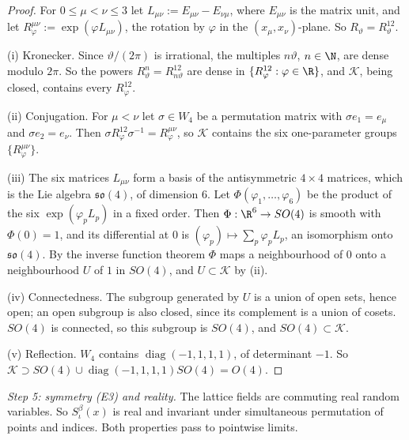 \begin{proof}
For $0\le\mu<\nu\le3$ let $L_{\mu\nu}:=E_{\mu\nu}-E_{\nu\mu}$, where $E_{\mu\nu}$ is the matrix unit, and let $R^{\mu\nu}_\varphi:=\exp(\varphi L_{\mu\nu})$, the rotation by $\varphi$ in the $(x_\mu,x_\nu)$-plane. So $R_\vartheta=R^{12}_\vartheta$.

(i) Kronecker. Since $\vartheta/(2\pi)$ is irrational, the multiples $n\vartheta$, $n\in\N$, are dense modulo $2\pi$. So the powers $R_\vartheta^n=R^{12}_{n\vartheta}$ are dense in $\{R^{12}_\varphi:\varphi\in\R\}$, and $\mathcal K$, being closed, contains every $R^{12}_\varphi$.

(ii) Conjugation. For $\mu<\nu$ let $\sigma\in W_4$ be a permutation matrix with $\sigma e_1=e_\mu$ and $\sigma e_2=e_\nu$. Then $\sigma R^{12}_\varphi\sigma^{-1}=R^{\mu\nu}_\varphi$, so $\mathcal K$ contains the six one-parameter groups $\{R^{\mu\nu}_\varphi\}$.

(iii) The six matrices $L_{\mu\nu}$ form a basis of the antisymmetric $4\times4$ matrices, which is the Lie algebra $\mathfrak{so}(4)$, of dimension $6$. Let $\Phi(\varphi_1,\dots,\varphi_6)$ be the product of the six $\exp(\varphi_pL_p)$ in a fixed order. Then $\Phi:\R^6\to SO(4)$ is smooth with $\Phi(0)=1$, and its differential at $0$ is $(\varphi_p)\mapsto\sum_p\varphi_pL_p$, an isomorphism onto $\mathfrak{so}(4)$. By the inverse function theorem $\Phi$ maps a neighbourhood of $0$ onto a neighbourhood $U$ of $1$ in $SO(4)$, and $U\subset\mathcal K$ by (ii).

(iv) Connectedness. The subgroup generated by $U$ is a union of open sets, hence open; an open subgroup is also closed, since its complement is a union of cosets. $SO(4)$ is connected, so this subgroup is $SO(4)$, and $SO(4)\subset\mathcal K$.

(v) Reflection. $W_4$ contains $\operatorname{diag}(-1,1,1,1)$, of determinant $-1$. So $\mathcal K\supset SO(4)\cup\operatorname{diag}(-1,1,1,1)SO(4)=O(4)$.
\end{proof}

\emph{Step 5: symmetry (E3) and reality.} The lattice fields are commuting real random variables. So $S^\beta_\iota(x)$ is real and invariant under simultaneous permutation of points and indices. Both properties pass to pointwise limits.

